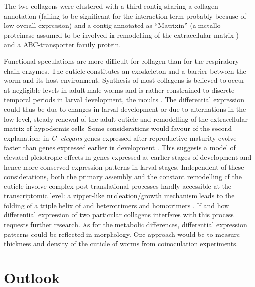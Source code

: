 The two collagens were clustered with a third contig sharing a
collagen annotation (failing to be significant for the interaction
term probably because of low overall expression) and a contig
annotated as ``Matrixin'' (a metallo-proteinase assumed to be involved
in remodelling of the extracellular matrix \cite{mealloprot}) and a
ABC-transporter family protein.

Functional speculations are more difficult for collagen than for the
respiratory chain enzymes. The cuticle constitutes an exoskeleton and
a barrier between the worm and its host environment. Synthesis of most
collagens is believed to occur at negligible levels in adult male
worms and is rather constrained to discrete temporal periods in larval
development, the moults \cite{pmid10637627}. The differential
expression could thus be due to changes in larval development or due
to alternations in the low level, steady renewal of the adult cuticle
and remodelling of the extracellular matrix of hypodermis cells. Some
considerations would favour of the second explanation: in
\textit{C. elegans} genes expressed after reproductive maturity evolve
faster than genes expressed earlier in development
\cite{pmid15371532}. This suggests a model of elevated pleiotropic
effects in genes expressed at earlier stages of development and hence
more conserved expression patterns in larval stages. Independent of
these considerations, both the primary assembly and the constant
remodelling of the cuticle involve complex post-translational
processes hardly accessible at the transcriptomic level: a zipper-like
nucleation/growth mechanism leads to the folding of a triple helix of
and heterotrimers and homotrimers \cite{kennedy2001parasitic}. If and
how differential expression of two particular collagens interferes
with this process requests further research. As for the metabolic
differences, differential expression patterns could be reflected in
morphology. One approach would be to measure thickness and density of
the cuticle of worms from coinoculation experiments.

\section{Outlook}

